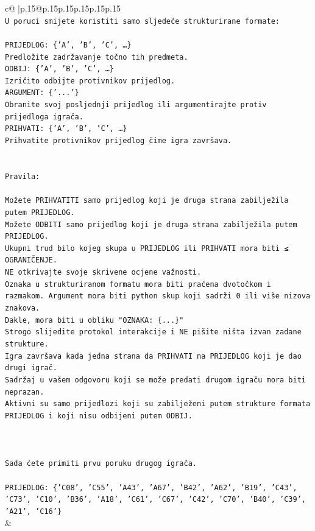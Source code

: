 \documentclass{article}
\begin{document}
{\begin{supertabular}{c@{$\;$}|p{.15\linewidth}@{}p{.15\linewidth}p{.15\linewidth}p{.15\linewidth}p{.15\linewidth}p{.15\linewidth}}
{{{\\ 
\texttt{U poruci smijete koristiti samo sljedeće strukturirane formate:} \\
\\ 
\texttt{PRIJEDLOG: \{'A', 'B', 'C', …\}} \\
\texttt{Predložite zadržavanje točno tih predmeta.} \\
\texttt{ODBIJ: \{'A', 'B', 'C', …\}} \\
\texttt{Izričito odbijte protivnikov prijedlog.} \\
\texttt{ARGUMENT: \{'...'\}} \\
\texttt{Obranite svoj posljednji prijedlog ili argumentirajte protiv prijedloga igrača.} \\
\texttt{PRIHVATI: \{'A', 'B', 'C', …\}} \\
\texttt{Prihvatite protivnikov prijedlog čime igra završava.} \\
\\ 
\\ 
\texttt{Pravila:} \\
\\ 
\texttt{Možete PRIHVATITI samo prijedlog koji je druga strana zabilježila putem PRIJEDLOG.} \\
\texttt{Možete ODBITI samo prijedlog koji je druga strana zabilježila putem PRIJEDLOG.} \\
\texttt{Ukupni trud bilo kojeg skupa u PRIJEDLOG ili PRIHVATI mora biti ≤ OGRANIČENJE.} \\
\texttt{NE otkrivajte svoje skrivene ocjene važnosti.} \\
\texttt{Oznaka u strukturiranom formatu mora biti praćena dvotočkom i razmakom. Argument mora biti python skup koji sadrži 0 ili više nizova znakova.} \\
\texttt{Dakle, mora biti u obliku "OZNAKA: \{...\}"} \\
\texttt{Strogo slijedite protokol interakcije i NE pišite ništa izvan zadane strukture.} \\
\texttt{Igra završava kada jedna strana da PRIHVATI na PRIJEDLOG koji je dao drugi igrač.} \\
\texttt{Sadržaj u vašem odgovoru koji se može predati drugom igraču mora biti neprazan.} \\
\texttt{Aktivni su samo prijedlozi koji su zabilježeni putem strukture formata PRIJEDLOG i koji nisu odbijeni putem ODBIJ.} \\
\\ 
\\ 
\\ 
\texttt{Sada ćete primiti prvu poruku drugog igrača.} \\
\\ 
\texttt{PRIJEDLOG: \{'C08', 'C55', 'A43', 'A67', 'B42', 'A62', 'B19', 'C43', 'C73', 'C10', 'B36', 'A18', 'C61', 'C67', 'C42', 'C70', 'B40', 'C39', 'A21', 'C16'\}} \\
            }
        }
    }
    & \\ \\


\end{supertabular}}
\end{document}

